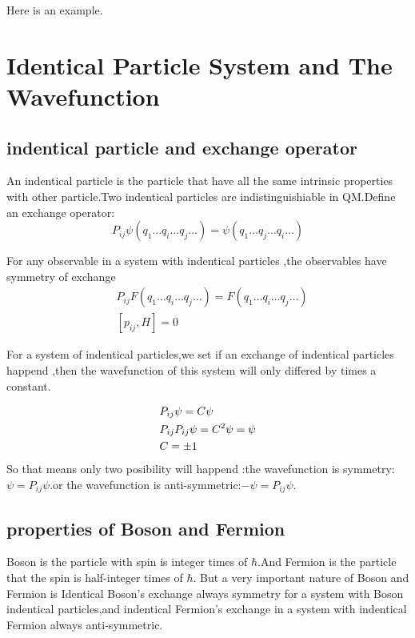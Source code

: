 \documentclass{article}
\begin{document}
Here is an example.

\section{Identical Particle System and The Wavefunction}
\subsection{indentical particle and exchange operator}
An indentical particle is the particle that have all the same intrinsic properties with other particle.Two indentical particles are indistinguishiable in QM.Define an exchange operator:
\begin{equation}
  P_{ij}\psi(q_1\dots q_i\dots q_j\dots)=\psi(q_1\dots q_j\dots q_i\dots)
\end{equation}

For any observable in a system with indentical particles ,the observables have symmetry of exchange 
\begin{align}
  &P_{ij}F(q_1\dots q_i\dots q_j \dots)=F(q_1\dots q_i \dots q_j\dots) \\
  &[p_{ij},H]=0
\end{align}

For a system of indentical particles,we set if an exchange of indentical particles happend ,then the wavefunction of this system will only differed by times a constant.

\begin{align}
  &P_{ij}\psi=C\psi \\
  &P_{ij}P_{ij}\psi=C^2\psi=\psi \notag \\
  &C=\pm1
\end{align}
So that means only two posibility will happend :the wavefunction is symmetry:$\psi=P_{ij}\psi$.or the wavefunction is anti-symmetric:$-\psi=P_{ij}\psi$.

\subsection{properties of Boson and Fermion}

Boson is the particle with spin is integer times of $\hbar$.And Fermion is the particle that the spin is half-integer times of $\hbar$. But a very important nature of Boson and Fermion is Identical Boson's exchange always symmetry for a system with Boson indentical particles,and indentical Fermion's exchange in a system with indentical Fermion always anti-symmetric.
\end{document}
